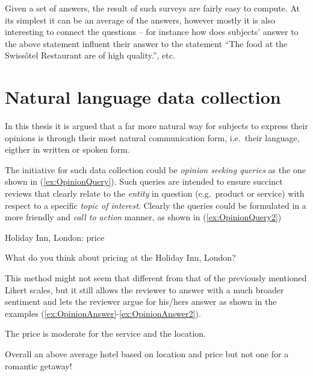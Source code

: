 Given a set of answers, the result of such surveys are fairly easy to compute. At its simplest it can be an average of the answers, however mostly it is also interesting to connect the questions -- for instance how does subjects' answer to the above statement influent their answer to the statement ``The food at the Swissôtel Restaurant are of high quality.'', etc. 

\vspace{8em}



\section{Natural language data collection}
\label{sec:naturalDataCollection}
In this thesis it is argued that a far more natural way for subjects to express their opinions is through their most natural communication form, i.e.\ their language, eigther in written or spoken form.

The initiative for such data collection could be \emph{opinion seeking queries} as the one shown in (\ref{ex:OpinionQuery}). Such queries are intended to ensure succinct reviews that clearly relate to the \emph{entity} in question (e.g.\ product or service) with respect to a specific \emph{topic of interest}. Clearly the queries could be formulated in a more friendly and \emph{call to action} manner, as shown in (\ref{ex:OpinionQuery2})
\begin{numquote}
	Holiday Inn, London: price
	\label{ex:OpinionQuery}
\end{numquote}
\begin{numquote}
	What do you think about pricing at the Holiday Inn, London?
	\label{ex:OpinionQuery2}
\end{numquote}

This method might not seem that different from that of the previously mentioned Likert scales, but it still allows the reviewer to answer with a much broader sentiment and lets the reviewer argue for his/hers answer as shown in the examples (\ref{ex:OpinionAnswer}-\ref{ex:OpinionAnswer2}).
\begin{numquote}
	The price is moderate for the service and the location.
	\label{ex:OpinionAnswer}
\end{numquote}
\begin{numquote}
	Overall an above average hotel based on location and price   but not one for a romantic getaway!
	\label{ex:OpinionAnswer2}
\end{numquote}

